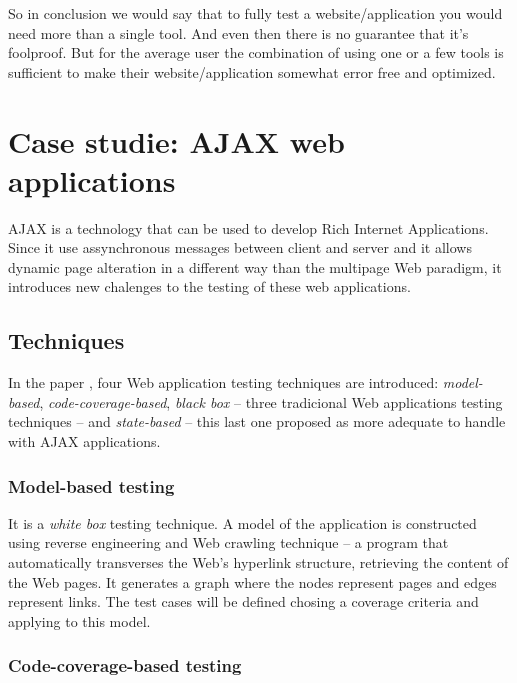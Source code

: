 \documentclass[a4paper]{article}
\begin{document}
So in conclusion we would say that to fully test a website/application you would need more than a single tool. And even then 
there is no guarantee that it’s foolproof.  But for the average user the combination of using one or a few tools is 
sufficient to make their website/application somewhat error free and optimized.



\section{Case studie: AJAX web applications \cite{mtr08}}

AJAX is a technology that can be used to develop Rich Internet Applications.
Since it use assynchronous messages between client and server and it allows dynamic page alteration in a different way than the multipage Web paradigm, it introduces new chalenges to the testing of these web applications.

\subsection{Techniques}
In the paper \cite{mtr08}, four Web application testing techniques are introduced: \emph{model-based}, \emph{code-coverage-based}, \emph{black box} -- three tradicional Web applications testing techniques -- and \emph{state-based} -- this last one proposed as more adequate to handle with AJAX applications.

\subsubsection{Model-based testing}

It is a \emph{white box} testing technique.
A model of the application is constructed using reverse engineering and Web crawling technique -- a program that automatically transverses the Web's hyperlink structure, retrieving the content of the Web pages.
It generates a graph where the nodes represent pages and edges represent links.
The test cases will be defined chosing a coverage criteria and applying to this model. 

\subsubsection{Code-coverage-based testing} 
\end{document}
